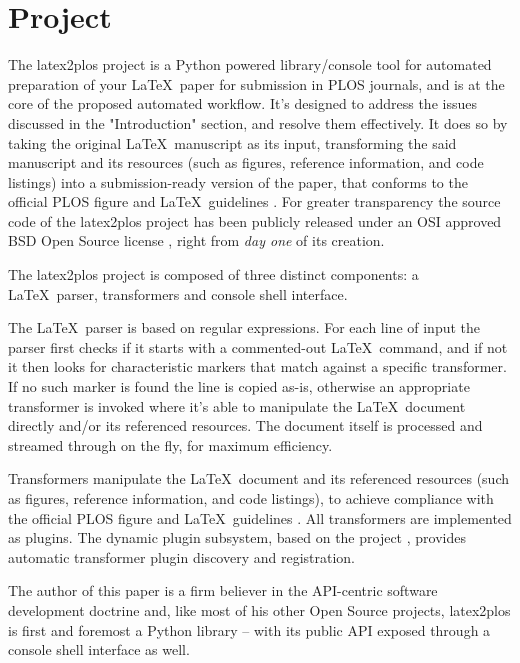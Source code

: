\section*{Project }

The latex2plos project \cite{latex2plos} is a Python \cite{Python} powered library/console tool for automated preparation of your \LaTeX~paper for submission in PLOS journals, and is at the core of the proposed automated workflow.
It's designed to address the issues discussed in the "Introduction" section, and resolve them effectively.
It does so by taking the original \LaTeX~manuscript as its input, transforming the said manuscript and its resources (such as figures, reference information, and code listings) into a submission-ready version of the paper, that conforms to the official PLOS figure and \LaTeX~guidelines \cite{PLOS:Figures, PLOS:LaTeX}.
For greater transparency the source code of the latex2plos project \cite{latex2plos} has been publicly released under an OSI approved BSD Open Source license \cite{OSI:BSD}, right from \emph{day one} of its creation.

The latex2plos project is composed of three distinct components: a \LaTeX~parser, transformers and console shell interface.

The \LaTeX~parser is based on regular expressions.
For each line of input the parser first checks if it starts with a commented-out \LaTeX~command, and if not it then looks for characteristic markers that match against a specific transformer.
If no such marker is found the line is copied as-is, otherwise an appropriate transformer is invoked where it's able to manipulate the \LaTeX~document directly and/or its referenced resources.
The document itself is processed and streamed through on the fly, for maximum efficiency.

Transformers manipulate the \LaTeX~document and its referenced resources (such as figures, reference information, and code listings), to achieve compliance with the official PLOS figure and \LaTeX~guidelines \cite{PLOS:Figures, PLOS:LaTeX}.
All transformers are implemented as plugins.
The dynamic plugin subsystem, based on the  project \cite{Project:simple_plugins:CodeRepository}, provides automatic transformer plugin discovery and registration.

The author of this paper is a firm believer in the API-centric software development doctrine and, like most of his other Open Source projects, latex2plos is first and foremost a Python library -- with its public API exposed through a console shell interface as well.

